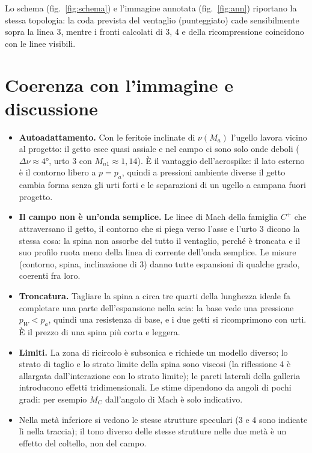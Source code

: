 \documentclass[11pt,a4paper]{article}
\newcommand{\Cp}{C^{+}}
\begin{document}
Lo schema (fig.~\ref{fig:schema}) e l'immagine annotata (fig.~\ref{fig:ann}) riportano la stessa topologia: la
coda prevista del ventaglio (punteggiato) cade sensibilmente sopra la linea 3, mentre i fronti calcolati di 3, 4 e
della ricompressione coincidono con le linee visibili.

\section{Coerenza con l'immagine e discussione}
\begin{itemize}
\item \textbf{Autoadattamento.} Con le feritoie inclinate di $\nu(M_a)$ l'ugello lavora vicino al progetto: il getto
  esce quasi assiale e nel campo ci sono solo onde deboli ($\Delta\nu\approx\ang{4}$, urto 3 con $M_{n1}\approx1{,}14$).
  È il vantaggio dell'aerospike: il lato esterno è il contorno libero a $p=p_a$, quindi a pressioni ambiente diverse
  il getto cambia forma senza gli urti forti e le separazioni di un ugello a campana fuori progetto.
\item \textbf{Il campo non è un'onda semplice.} Le linee di Mach della famiglia $\Cp$ che attraversano il getto, il
  contorno che si piega verso l'asse e l'urto 3 dicono la stessa cosa: la spina non assorbe del tutto il ventaglio,
  perché è troncata e il suo profilo ruota meno della linea di corrente dell'onda semplice. Le misure (contorno,
  spina, inclinazione di 3) danno tutte espansioni di qualche grado, coerenti fra loro.
\item \textbf{Troncatura.} Tagliare la spina a circa tre quarti della lunghezza ideale fa completare una parte
  dell'espansione nella scia: la base vede una pressione $p_W<p_a$, quindi una resistenza di base, e i due getti si
  ricomprimono con urti. È il prezzo di una spina più corta e leggera.
\item \textbf{Limiti.} La zona di ricircolo è subsonica e richiede un modello diverso; lo strato di taglio e lo strato
  limite della spina sono viscosi (la riflessione 4 è allargata dall'interazione con lo strato limite); le pareti
  laterali della galleria introducono effetti tridimensionali. Le stime dipendono da angoli di pochi gradi: per
  esempio $M_C$ dall'angolo di Mach è solo indicativo.
\item Nella metà inferiore si vedono le stesse strutture speculari (3 e 4 sono indicate lì nella traccia); il tono
  diverso delle stesse strutture nelle due metà è un effetto del coltello, non del campo.
\end{itemize}
\end{document}
